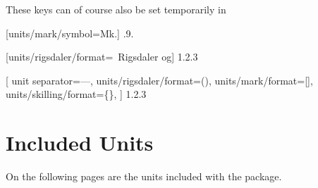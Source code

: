 \documentclass[
	a4paper,
	margin=4cm
]{article}
\begin{document}
These keys can of course also be set temporarily in 

\begin{dispExample}
	[units/mark/symbol=Mk.]
	{.9.}

	[units/rigsdaler/format={\VALUE~Rigsdaler og}]
	{1.2.3}

[
		unit separator={---},
		units/rigsdaler/format={(\VALUE)},
		units/mark/format={[\VALUE]},
		units/skilling/format={\{\VALUE\}},
	]
	{1.2.3}
\end{dispExample}

\clearpage
\section{Included Units} %

\label{units:included}
On the following pages are the units included with the package.


\clearpage
{}


\printindex  %
\end{document}
